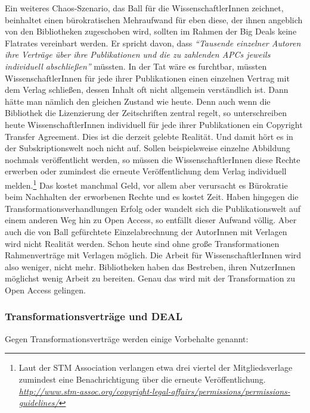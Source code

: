 \documentclass[a4paper,
fontsize=11pt,
oneside,
numbers=noperiodatend,
parskip=half-,
bibliography=totoc,
final
]{scrartcl}
\begin{document}
Ein weiteres Chaos-Szenario, das Ball für die WissenschaftlerInnen
zeichnet, beinhaltet einen bürokratischen Mehraufwand für eben diese,
der ihnen angeblich von den Bibliotheken zugeschoben wird, sollten im
Rahmen der Big Deals keine Flatrates vereinbart werden. Er spricht
davon, dass \emph{\enquote{Tausende einzelner Autoren ihre Verträge über
ihre Publikationen und die zu zahlenden APCs jeweils individuell
abschließen}} müssten. In der Tat wäre es furchtbar, müssten
WissenschaftlerInnen für jede ihrer Publikationen einen einzelnen
Vertrag mit dem Verlag schließen, dessen Inhalt oft nicht allgemein
verständlich ist. Dann hätte man nämlich den gleichen Zustand wie heute.
Denn auch wenn die Bibliothek die Lizenzierung der Zeitschriften zentral
regelt, so unterschreiben heute WissenschaftlerInnen individuell für
jede ihrer Publikationen ein Copyright Transfer Agreement. Dies ist die
derzeit gelebte Realität. Und damit hört es in der Subskriptionswelt
noch nicht auf. Sollen beispielsweise einzelne Abbildung nochmals
veröffentlicht werden, so müssen die WissenschaftlerInnen diese Rechte
erwerben oder zumindest die erneute Veröffentlichung dem Verlag
individuell melden.\footnote{Laut der STM Association verlangen etwa
  drei viertel der Mitgliedsverlage zumindest eine Benachrichtigung über
  die erneute Veröffentlichung.
  \href{http://www.stm-assoc.org/copyright-legal-affairs/permissions/permissions-guidelines/}{\emph{http://www.stm-assoc.org/copyright-legal-affairs/permissions/permissions-guidelines/}}}
Das kostet manchmal Geld, vor allem aber verursacht es Bürokratie beim
Nachhalten der erworbenen Rechte und es kostet Zeit. Haben hingegen die
Transformationsverhandlungen Erfolg oder wandelt sich die
Publikationswelt auf einem anderen Weg hin zu Open Access, so entfällt
dieser Aufwand völlig. Aber auch die von Ball gefürchtete
Einzelabrechnung der AutorInnen mit Verlagen wird nicht Realität werden.
Schon heute sind ohne große Transformationen Rahmenverträge mit Verlagen
möglich. Die Arbeit für WissenschaftlerInnen wird also weniger, nicht
mehr. Bibliotheken haben das Bestreben, ihren NutzerInnen möglichst
wenig Arbeit zu bereiten. Genau das wird mit der Transformation zu Open
Access gelingen.

\subsubsection{Transformationsverträge und
DEAL}\label{transformationsvertruxe4ge-und-deal}

Gegen Transformationsverträge werden einige Vorbehalte genannt:
\end{document}
